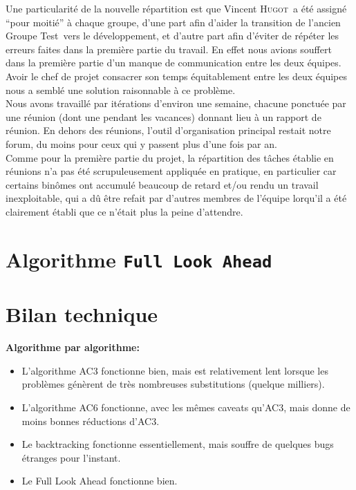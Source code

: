 \documentclass[a4paper,12pt]{article}
\def\familyname{\textsc}
\def\firstname#1{#1}
\def\groupmember#1#2{\firstname{#1} \familyname{#2}}
\def\mvin{\groupmember{Vincent}{Hugot}}
\def\grpt{Groupe Test}
\newcommand\seclvlA{
\newcommand\SA\section
\newcommand\SB\subsection
\newcommand\SC\subsubsection}
\begin{document}
\noi Une particularité de la nouvelle répartition est que \mvin\ a
été assigné ``pour moitié'' à chaque groupe, d'une part
afin d'aider la transition de l'ancien \grpt\ vers le développement,
et d'autre part afin d'éviter de répéter les erreurs faites dans la première
partie du travail. En effet nous avions souffert dans la première partie
d'un manque de communication entre les deux équipes.
Avoir le chef de projet consacrer son temps équitablement
entre les deux équipes nous a semblé une solution raisonnable
à ce problème.\mk\\
%
Nous avons travaillé par itérations d'environ une semaine,
chacune ponctuée par une réunion (dont une pendant les vacances)
donnant lieu à un rapport de réunion.
En dehors des réunions, l'outil d'organisation
principal restait notre forum, du moins pour ceux
qui y passent plus d'une fois par an.\mk\\
%
Comme pour la première partie du projet, la répartition
des tâches établie en réunions n'a pas été scrupuleusement
appliquée en pratique, 
en particulier car certains binômes ont
accumulé beaucoup de retard et/ou rendu
un travail inexploitable, qui a dû être refait par 
d'autres membres de l'équipe lorqu'il a été clairement
établi que ce n'était plus la peine d'attendre.


\section{Algorithme \texttt{Full Look Ahead}}




\seclvlA


\section{Bilan technique}

\textbf{Algorithme par algorithme:}
\begin{itemize}
\item L'algorithme AC3 fonctionne bien, mais est relativement lent lorsque les problèmes 
génèrent de très nombreuses substitutions (quelque milliers).

\item L'algorithme AC6 fonctionne, avec les mêmes caveats qu'AC3, mais donne de moins bonnes
réductions d'AC3.

\item Le backtracking fonctionne essentiellement, mais souffre de quelques bugs étranges pour l'instant. 

\item Le Full Look Ahead fonctionne bien.
  
\end{itemize}
\end{document}
